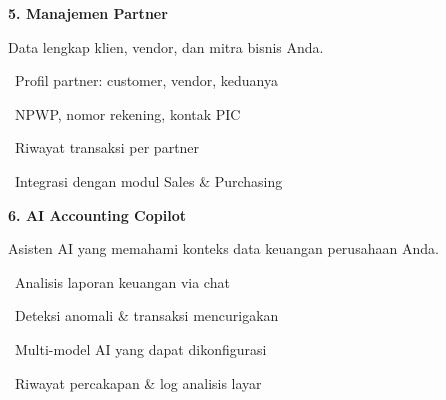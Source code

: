 \documentclass[a4paper]{article}
\begin{document}
\vspace{8pt}

\noindent
\begin{minipage}[t]{0.485\textwidth}
    \colorbox{BlueDark}{%
        \begin{minipage}{\dimexpr\textwidth-14pt}
            \vspace{5pt}
            {\fontsize{10}{13}\selectfont\bfseries\color{White} 5. Manajemen Partner}
            \vspace{5pt}
        \end{minipage}}
    \vspace{5pt}
    {\fontsize{9}{12}\selectfont\color{TextDark}%
    Data lengkap klien, vendor, dan mitra bisnis Anda.\par\vspace{3pt}
    \textbullet\ Profil partner: customer, vendor, keduanya\par\vspace{2pt}%
    \textbullet\ NPWP, nomor rekening, kontak PIC\par\vspace{2pt}%
    \textbullet\ Riwayat transaksi per partner\par\vspace{2pt}%
    \textbullet\ Integrasi dengan modul Sales \& Purchasing}%
\end{minipage}%
\hfill
\begin{minipage}[t]{0.485\textwidth}
    \colorbox{OrangePrimary}{%
        \begin{minipage}{\dimexpr\textwidth-14pt}
            \vspace{5pt}
            {\fontsize{10}{13}\selectfont\bfseries\color{White} 6. AI Accounting Copilot}
            \vspace{5pt}
        \end{minipage}}
    \vspace{5pt}
    {\fontsize{9}{12}\selectfont\color{TextDark}%
    Asisten AI yang memahami konteks data keuangan perusahaan Anda.\par\vspace{3pt}
    \textbullet\ Analisis laporan keuangan via chat\par\vspace{2pt}%
    \textbullet\ Deteksi anomali \& transaksi mencurigakan\par\vspace{2pt}%
    \textbullet\ Multi-model AI yang dapat dikonfigurasi\par\vspace{2pt}%
    \textbullet\ Riwayat percakapan \& log analisis layar}%
\end{minipage}
\end{document}
